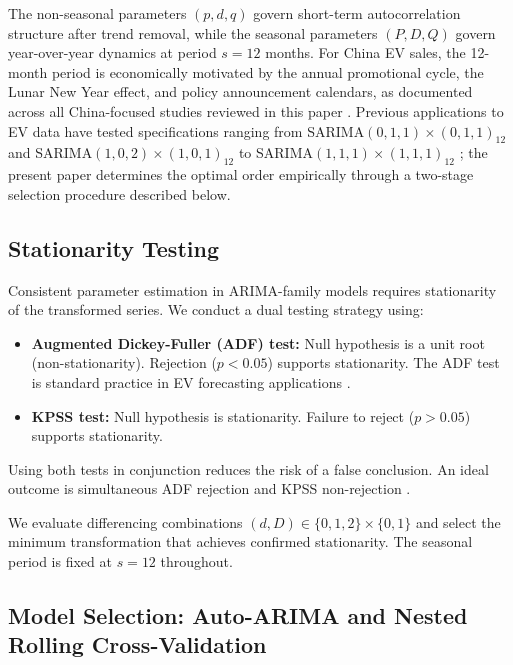\documentclass[12pt]{article}
\begin{document}
The non-seasonal parameters $(p, d, q)$ govern short-term autocorrelation structure after trend removal, while the seasonal parameters $(P, D, Q)$ govern year-over-year dynamics at period $s = 12$ months. For China EV sales, the 12-month period is economically motivated by the annual promotional cycle, the Lunar New Year effect, and policy announcement calendars, as documented across all China-focused studies reviewed in this paper \citep{chen2025, liang2025, ge2024}. Previous applications to EV data have tested specifications ranging from SARIMA$(0,1,1)\times(0,1,1)_{12}$ \citep{liang2025} and SARIMA$(1,0,2)\times(1,0,1)_{12}$ \citep{cetin2024} to SARIMA$(1,1,1)\times(1,1,1)_{12}$ \citep{chen2025}; the present paper determines the optimal order empirically through a two-stage selection procedure described below.

\subsection{Stationarity Testing}

Consistent parameter estimation in ARIMA-family models requires stationarity of the transformed series. We conduct a dual testing strategy using:

\begin{itemize}
\item \textbf{Augmented Dickey-Fuller (ADF) test:} Null hypothesis is a unit root (non-stationarity). Rejection ($p < 0.05$) supports stationarity. The ADF test is standard practice in EV forecasting applications \citep{liang2025, lu2024, cetin2024, chen2025}.
\item \textbf{KPSS test:} Null hypothesis is stationarity. Failure to reject ($p > 0.05$) supports stationarity.
\end{itemize}

Using both tests in conjunction reduces the risk of a false conclusion. An ideal outcome is simultaneous ADF rejection and KPSS non-rejection \citep{cetin2024}.

We evaluate differencing combinations $(d, D) \in \{0,1,2\} \times \{0,1\}$ and select the minimum transformation that achieves confirmed stationarity. The seasonal period is fixed at $s = 12$ throughout.

\subsection{Model Selection: Auto-ARIMA and Nested Rolling Cross-Validation}
\end{document}
